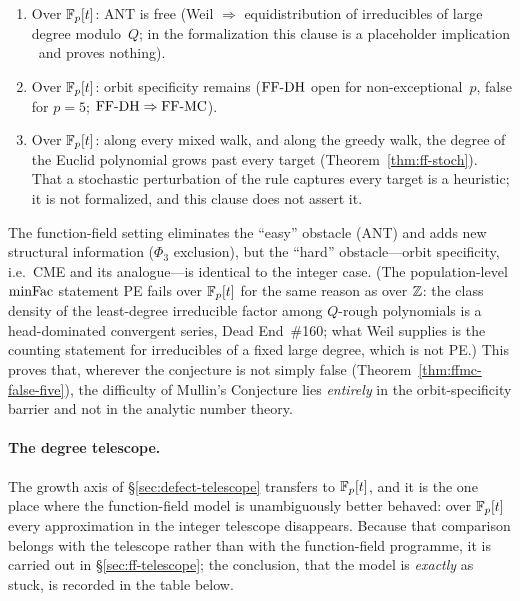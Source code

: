 \begin{theorem}
\label{thm:setting-independent}
\begin{enumerate}[nosep,label=(\roman*)]
\item Over $\mathbb{F}_p[t]$: ANT is free (Weil $\Rightarrow$ equidistribution of
  irreducibles of large degree modulo~$Q$; in the formalization this
  clause is a placeholder implication \placeholder\ and proves nothing).
\item Over $\mathbb{F}_p[t]$: orbit specificity remains ($\mathrm{FF\text{-}DH}$ open for
  non-exceptional~$p$, false for $p = 5$; $\mathrm{FF\text{-}DH} \Rightarrow \mathrm{FF\text{-}MC}$).
\item Over $\mathbb{F}_p[t]$: along every mixed walk, and along the greedy walk,
  the degree of the Euclid polynomial grows past every target
  (Theorem~\ref{thm:ff-stoch}).  That a stochastic perturbation of the
  rule captures every target is a heuristic; it is not formalized, and
  this clause does not assert it.
\end{enumerate}
\end{theorem}

The function-field setting eliminates the ``easy'' obstacle (ANT)
and adds new structural information ($\Phi_3$ exclusion), but the
``hard'' obstacle---orbit specificity, i.e.\ CME and its analogue---is
identical to the integer case.  (The population-level $\mathrm{minFac}$
statement PE fails over $\mathbb{F}_p[t]$ for the same reason as over $\mathbb{Z}$: the
class density of the least-degree irreducible factor among $Q$-rough
polynomials is a head-dominated convergent series, Dead End~\#160; what
Weil supplies is the counting statement for irreducibles of a fixed
large degree, which is not PE\@.)  This proves that, wherever the
conjecture is not simply false (Theorem~\ref{thm:ffmc-false-five}), the
difficulty of Mullin's Conjecture lies \emph{entirely} in the
orbit-specificity barrier and not in the analytic number theory.

\paragraph{The degree telescope.}
The growth axis of \S\ref{sec:defect-telescope} transfers to $\mathbb{F}_p[t]$, and
it is the one place where the function-field model is unambiguously better
behaved: over $\mathbb{F}_p[t]$ every approximation in the integer telescope
disappears.  Because that comparison belongs with the telescope rather than
with the function-field programme, it is carried out in
\S\ref{sec:ff-telescope}; the conclusion, that the model is \emph{exactly}
as stuck, is recorded in the table below.


